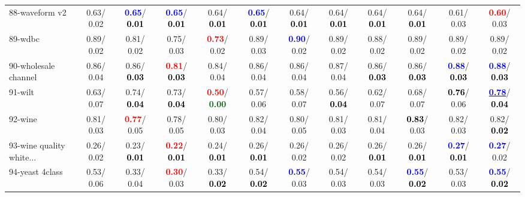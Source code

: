 \begin{table}[h]
\begin{center}
{\begin{tabular}{lc|c|c|c|c|c|c|c|c|c|c}
88-waveform v2 &   0.63/  0.02 & \textcolor{blue}{\textbf{  0.65}}/\textcolor{black}{\textbf{  0.01}} & \textcolor{blue}{\textbf{  0.65}}/\textcolor{black}{\textbf{  0.01}} &   0.64/\textcolor{black}{\textbf{  0.01}} & \textcolor{blue}{\textbf{  0.65}}/\textcolor{black}{\textbf{  0.01}} &   0.64/\textcolor{black}{\textbf{  0.01}} &   0.64/\textcolor{black}{\textbf{  0.01}} &   0.64/\textcolor{black}{\textbf{  0.01}} &   0.64/\textcolor{black}{\textbf{  0.01}} &   0.61/  0.03 & \textcolor{red}{\textbf{  0.60}}/  0.03 \\
89-wdbc &   0.89/  0.02 &   0.81/  0.02 &   0.75/  0.03 & \textcolor{red}{\textbf{  0.73}}/  0.02 &   0.89/  0.03 & \textcolor{blue}{\textbf{  0.90}}/  0.02 &   0.89/  0.02 &   0.88/  0.02 &   0.89/  0.02 &   0.89/  0.02 &   0.89/  0.02 \\
90-wholesale channel &   0.86/  0.04 &   0.86/\textcolor{black}{\textbf{  0.03}} & \textcolor{red}{\textbf{  0.81}}/\textcolor{black}{\textbf{  0.03}} &   0.84/  0.04 &   0.86/  0.04 &   0.86/  0.04 &   0.87/  0.04 &   0.86/\textcolor{black}{\textbf{  0.03}} &   0.86/\textcolor{black}{\textbf{  0.03}} & \textcolor{blue}{\textbf{  0.88}}/\textcolor{black}{\textbf{  0.03}} & \textcolor{blue}{\textbf{  0.88}}/\textcolor{black}{\textbf{  0.03}} \\
91-wilt &   0.63/  0.07 &   0.74/\textcolor{black}{\textbf{  0.04}} &   0.73/\textcolor{black}{\textbf{  0.04}} & \textcolor{red}{\textbf{  0.50}}/\textcolor{darkgreen}{\textbf{  0.00}} &   0.57/  0.06 &   0.58/  0.07 &   0.56/\textcolor{black}{\textbf{  0.04}} &   0.62/  0.07 &   0.68/  0.07 & \textcolor{black}{\textbf{  0.76}}/  0.06 & \underline{\textcolor{blue}{\textbf{  0.78}}}/\textcolor{black}{\textbf{  0.04}} \\
92-wine &   0.81/  0.03 & \textcolor{red}{\textbf{  0.77}}/  0.05 &   0.78/  0.05 &   0.80/  0.03 &   0.82/  0.04 &   0.80/  0.05 &   0.81/  0.03 &   0.81/  0.04 & \textcolor{black}{\textbf{  0.83}}/  0.03 &   0.82/  0.03 &   0.82/\textcolor{black}{\textbf{  0.02}} \\ \hline
93-wine quality white... &   0.26/  0.02 &   0.23/\textcolor{black}{\textbf{  0.01}} & \textcolor{red}{\textbf{  0.22}}/\textcolor{black}{\textbf{  0.01}} &   0.24/\textcolor{black}{\textbf{  0.01}} &   0.26/\textcolor{black}{\textbf{  0.01}} &   0.26/  0.02 &   0.26/  0.02 &   0.26/\textcolor{black}{\textbf{  0.01}} &   0.26/\textcolor{black}{\textbf{  0.01}} & \textcolor{blue}{\textbf{  0.27}}/\textcolor{black}{\textbf{  0.01}} & \textcolor{blue}{\textbf{  0.27}}/  0.02 \\
94-yeast 4class &   0.53/  0.06 &   0.33/  0.04 & \textcolor{red}{\textbf{  0.30}}/  0.03 &   0.33/\textcolor{black}{\textbf{  0.02}} &   0.54/\textcolor{black}{\textbf{  0.02}} & \textcolor{blue}{\textbf{  0.55}}/  0.03 &   0.54/  0.03 &   0.54/  0.03 & \textcolor{blue}{\textbf{  0.55}}/\textcolor{black}{\textbf{  0.02}} &   0.53/  0.03 & \textcolor{blue}{\textbf{  0.55}}/\textcolor{black}{\textbf{  0.02}} \\\end{tabular}
}\label{strats2bC4.5w}
\end{center}
\end{table}
                                     